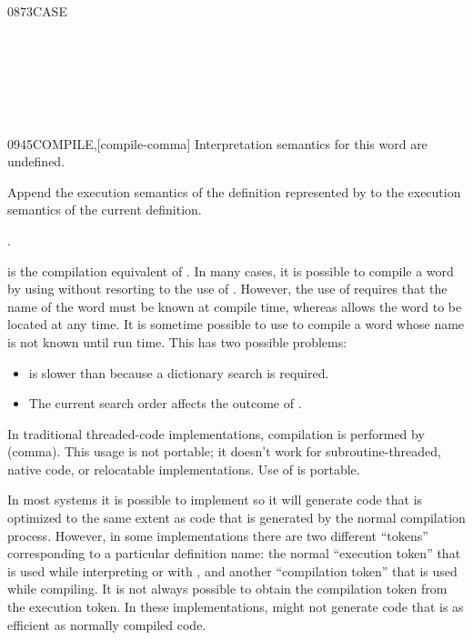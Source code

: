 \begin{worddef}{0873}{CASE}
\begin{testing}
		 \\
		 \\
		 \\
		 \\
		 \\
	\end{testing}
\end{worddef}


\begin{worddef}{0945}{COMPILE,}[compile-comma]
\interpret
	Interpretation semantics for this word are undefined.

\execute

	Append the execution semantics of the definition represented
	by  to the execution semantics of the current
	definition.

\see {}.

	\begin{rationale} %
		 is the compilation equivalent of
		. In many cases, it is possible to compile a
		word by using  without resorting to the use of
		. However, the use of  requires
		that the name of the word must be known at compile time,
		whereas  allows the word to be located at any
		time. It is sometime possible to use  to compile
		a word whose name is not known until run time. This has two
		possible problems:
		\begin{itemize}
		\item {} is slower than  because a
			dictionary search is required.
		\item The current search order affects the outcome of
			.
		\end{itemize}
		In traditional threaded-code implementations, compilation is
		performed by \word{,} (comma). This usage is not portable; it
		doesn't work for subroutine-threaded, native code, or
		relocatable implementations. Use of  is portable.

		In most systems it is possible to implement  so
		it will generate code that is optimized to the same extent as
		code that is generated by the normal compilation process.
		However, in some implementations there are two different
		``tokens'' corresponding to a particular definition name:
		the normal ``execution token'' that is used while interpreting
		or with , and another ``compilation token'' that
		is used while compiling. It is not always possible to obtain
		the compilation token from the execution token. In these
		implementations,  might not generate code that
		is as efficient as normally compiled code.
	\end{rationale}


\end{worddef}
